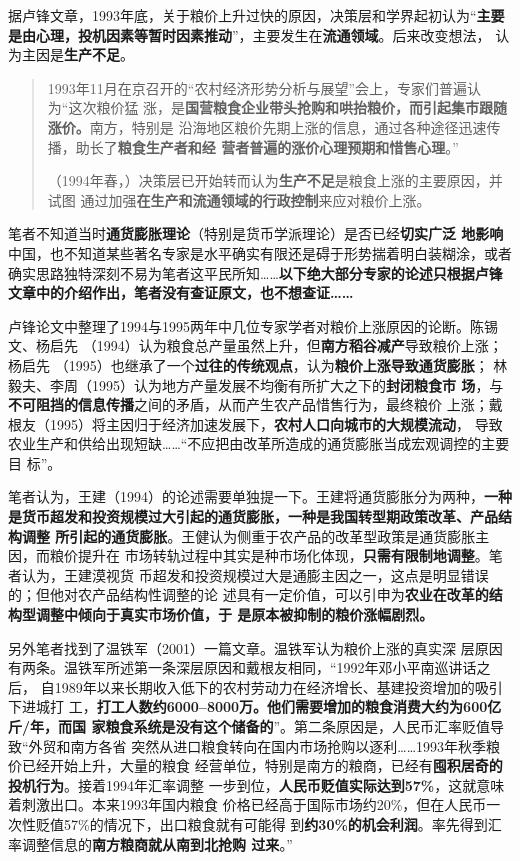 据卢锋文章，1993年底，关于粮价上升过快的原因，决策层和学界起初认为“\textbf{主要
  是由心理，投机因素等暂时因素推动}”，主要发生在\textbf{流通领域}。后来改变想法，
认为主因是\textbf{生产不足}。
\begin{quotation}
  1993年11月在京召开的“农村经济形势分析与展望”会上，专家们普遍认为“这次粮价猛
  涨，是\textbf{国营粮食企业带头抢购和哄抬粮价，而引起集市跟随涨价。}南方，特别是
  沿海地区粮价先期上涨的信息，通过各种途径迅速传播，助长了\textbf{粮食生产者和经
    营者普遍的涨价心理预期和惜售心理}。”

  （1994年春，）决策层已开始转而认为\textbf{生产不足}是粮食上涨的主要原因，并试图
  通过加强\textbf{在生产和流通领域的行政控制}来应对粮价上涨。
\end{quotation}

笔者不知道当时\textbf{通货膨胀理论}（特别是货币学派理论）是否已经\textbf{切实广泛
  地影响}中国，也不知道某些著名专家是水平确实有限还是碍于形势揣着明白装糊涂，或者
确实思路独特深刻不易为笔者这平民所知……\textbf{以下绝大部分专家的论述只根据卢锋
  文章中的介绍作出，笔者没有查证原文，也不想查证……}

卢锋论文中整理了1994与1995两年中几位专家学者对粮价上涨原因的论断。陈锡文、杨启先
（1994）认为粮食总产量虽然上升，但\textbf{南方稻谷减产}导致粮价上涨；杨启先
（1995）也继承了一个\textbf{过往的传统观点}，认为\textbf{粮价上涨导致通货膨胀}；
林毅夫、李周（1995）认为地方产量发展不均衡有所扩大之下的\textbf{封闭粮食市
  场}，与\textbf{不可阻挡的信息传播}之间的矛盾，从而产生农产品惜售行为，最终粮价
上涨；戴根友（1995）将主因归于经济加速发展下，\textbf{农村人口向城市的大规模流动}，
导致农业生产和供给出现短缺……“不应把由改革所造成的通货膨胀当成宏观调控的主要目
标”。

笔者认为，王建（1994）的论述需要单独提一下。王建将通货膨胀分为两种，\textbf{一种
  是货币超发和投资规模过大引起的通货膨胀，一种是我国转型期政策改革、产品结构调整
  所引起的通货膨胀}。王健认为侧重于农产品的改革型政策是通货膨胀主因，而粮价提升在
市场转轨过程中其实是种市场化体现，\textbf{只需有限制地调整}。笔者认为，王建漠视货
币超发和投资规模过大是通膨主因之一，这点是明显错误的；但他对农产品结构性调整的论
述具有一定价值，可以引申为\textbf{农业在改革的结构型调整中倾向于真实市场价值，于
  是原本被抑制的粮价涨幅剧烈。}

另外笔者找到了温铁军（2001）一篇文章\cite{6cibodong}。温铁军认为粮价上涨的真实深
层原因有两条。温铁军所述第一条深层原因和戴根友相同，“1992年邓小平南巡讲话之后，
自1989年以来长期收入低下的农村劳动力在经济增长、基建投资增加的吸引下进城打
工，\textbf{打工人数约6000--8000万。他们需要增加的粮食消费大约为600亿斤/年，而国
  家粮食系统是没有这个储备的}”。第二条原因是，人民币汇率贬值导致“外贸和南方各省
突然从进口粮食转向在国内市场抢购以逐利……1993年秋季粮价已经开始上升，大量的粮食
经营单位，特别是南方的粮商，已经有\textbf{囤积居奇的投机行为}。接着1994年汇率调整
一步到位，\textbf{人民币贬值实际达到57\%}，这就意味着刺激出口。本来1993年国内粮食
价格已经高于国际市场约20\%，但在人民币一次性贬值57\%的情况下，出口粮食就有可能得
到\textbf{约30\%的机会利润}。率先得到汇率调整信息的\textbf{南方粮商就从南到北抢购
  过来}。”

